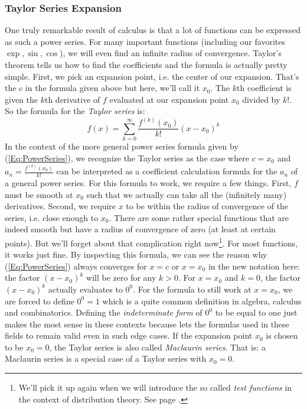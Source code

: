 \subsubsection{Taylor Series Expansion}
\label{Sec:TaylorSeries}
One truly remarkable result of calculus is that a lot of functions can be expressed as such a power series. For many important functions (including our favorites $\exp, \sin, \cos$), we will even find an infinite radius of convergence. Taylor's theorem tells us how to find the coefficients and the formula is actually pretty simple. First, we pick an expansion point, i.e. the center of our expansion. That's the $c$ in the formula given above but here, we'll call it $x_0$. The $k$th coefficient is given the $k$th derivative of $f$ evaluated at our expansion point $x_0$ divided by $k!$. So the formula for the \emph{Taylor series} is:
\begin{equation}
\label{Eq:TaylorSeries}
f(x) = \sum_{k=0}^\infty \frac{f^{(k)}(x_0)}{k!} (x-x_0)^k
\end{equation}
In the context of the more general power series formula given by (\ref{Eq:PowerSeries}), we recognize the Taylor series as the case where $c = x_0$ and $a_n =  \frac{f^{(k)}(x_0)}{k!}$ can be interpreted as a coefficient calculation formula for the $a_n$ of a general power series. For this formula to work, we require a few things. First, $f$ must be smooth at $x_0$ such that we actually can take all the (infinitely many) derivatives. Second, we require $x$ to be within the radius of convergence of the series, i.e. close enough to $x_0$. There are some rather special functions that are indeed smooth but have a radius of convergence of zero (at least at certain points). But we'll forget about that complication right now\footnote{We'll pick it up again when we will introduce the so called \emph{test functions} in the context of distribution theory. See page \pageref{Sec:TestFunctions}.}. For most functions, it works just fine. By inspecting this formula, we can see the reason why (\ref{Eq:PowerSeries}) always converges for $x=c$ or $x=x_0$ in the new notation here: the factor $(x-x_0)^k$ will be zero for any $k > 0$. For $x = x_0$ and $k = 0$, the factor $(x-x_0)^k$ actually evaluates to $0^0$. For the formula to still work at $x=x_0$, we are forced to define $0^0 = 1$ which is a quite common definition in algebra, calculus and combinatorics. Defining the \emph{indeterminate form} of $0^0$ to be equal to one just makes the most sense in these contexts because lets the formulas used in these fields to remain valid even in such edge cases. If the expansion point $x_0$ is chosen to be $x_0 = 0$, the Taylor series is also called \emph{Maclaurin series}. That is: a Maclaurin series is a special case of a Taylor series with $x_0 = 0$. 

